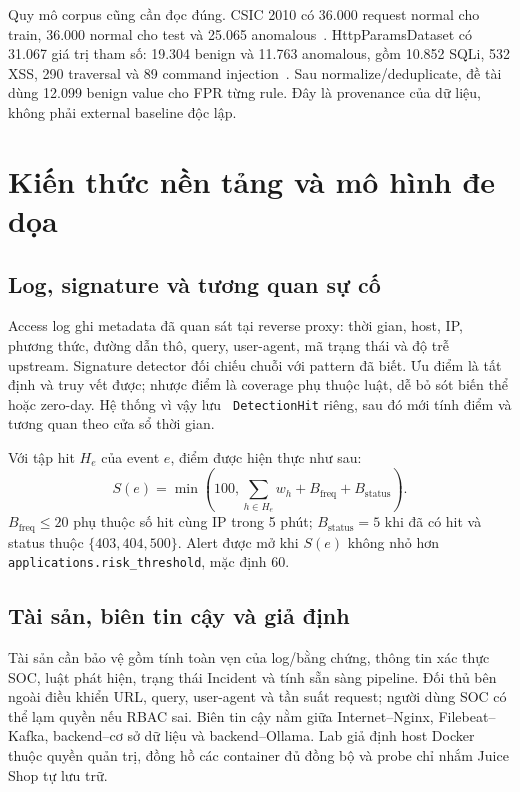 \documentclass[runningheads]{report-template/llncs}
\newcommand{\code}[1]{\texttt{\small\hyphenchar\font=45 #1}}
\begin{document}
Quy mô corpus cũng cần đọc đúng. CSIC 2010 có 36.000 request normal cho
train, 36.000 normal cho test và 25.065 anomalous~\cite{csic}.
HttpParamsDataset có 31.067 giá trị tham số: 19.304 benign và 11.763
anomalous, gồm 10.852 SQLi, 532 XSS, 290 traversal và 89 command
injection~\cite{httpParams}. Sau normalize/deduplicate, đề tài dùng 12.099
benign value cho FPR từng rule. Đây là provenance của dữ liệu, không phải
external baseline độc lập.

\section{Kiến thức nền tảng và mô hình đe dọa}

\subsection{Log, signature và tương quan sự cố}

Access log ghi metadata đã quan sát tại reverse proxy: thời gian, host,
IP, phương thức, đường dẫn thô, query, user-agent, mã trạng thái và độ
trễ upstream. Signature detector đối chiếu chuỗi với pattern đã biết.
Ưu điểm là tất định và truy vết được; nhược điểm là coverage phụ thuộc
luật, dễ bỏ sót biến thể hoặc zero-day. Hệ thống vì vậy lưu
\code{DetectionHit} riêng, sau đó mới tính điểm và tương quan theo cửa sổ
thời gian.

Với tập hit \(H_e\) của event \(e\), điểm được hiện thực như sau:
\[
 S(e)=\min\left(100,\sum_{h\in H_e}w_h+B_{\mathrm{freq}}+
 B_{\mathrm{status}}\right).
\]
\(B_{\mathrm{freq}}\leq20\) phụ thuộc số hit cùng IP trong 5 phút;
\(B_{\mathrm{status}}=5\) khi đã có hit và status thuộc
\(\{403,404,500\}\). Alert được mở khi \(S(e)\) không nhỏ hơn
\code{applications.risk\_threshold}, mặc định 60.

\subsection{Tài sản, biên tin cậy và giả định}

Tài sản cần bảo vệ gồm tính toàn vẹn của log/bằng chứng, thông tin xác
thực SOC, luật phát hiện, trạng thái Incident và tính sẵn sàng pipeline.
Đối thủ bên ngoài điều khiển URL, query, user-agent và tần suất request;
người dùng SOC có thể lạm quyền nếu RBAC sai. Biên tin cậy nằm giữa
Internet--Nginx, Filebeat--Kafka, backend--cơ sở dữ liệu và backend--Ollama.
Lab giả định host Docker thuộc quyền quản trị, đồng hồ các container đủ
đồng bộ và probe chỉ nhắm Juice Shop tự lưu trữ.
\end{document}
